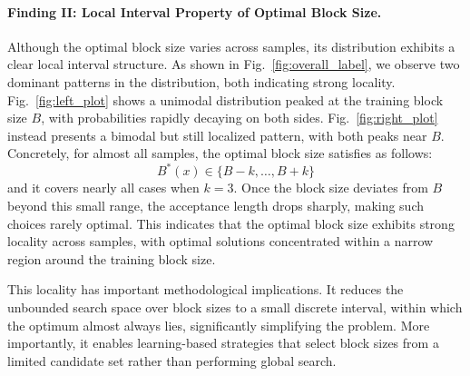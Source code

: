 \documentclass{article}
\begin{document}
\paragraph{Finding II: Local Interval Property of Optimal Block Size.}
Although the optimal block size varies across samples, its distribution exhibits a clear local interval structure. As shown in Fig.~\ref{fig:overall_label}, we observe two dominant patterns in the distribution, both indicating strong locality. Fig.~\ref{fig:left_plot} shows a unimodal distribution peaked at the training block size $B$, with probabilities rapidly decaying on both sides. Fig.~\ref{fig:right_plot} instead presents a bimodal but still localized pattern, with both peaks near $B$. Concretely, for almost all samples, the optimal block size satisfies as follows:
\begin{equation}
B^*(x) \in \{B-k, \ldots, B+k\}
\end{equation}
and it covers nearly all cases when $k=3$. Once the block size deviates from $B$ beyond this small range, the acceptance length drops sharply, making such choices rarely optimal. This indicates that the optimal block size exhibits strong locality across samples, with optimal solutions concentrated within a narrow region around the training block size.

This locality has important methodological implications. It reduces the unbounded search space over block sizes to a small discrete interval, within which the optimum almost always lies, significantly simplifying the problem. More importantly, it enables learning-based strategies that select block sizes from a limited candidate set rather than performing global search.
\end{document}
